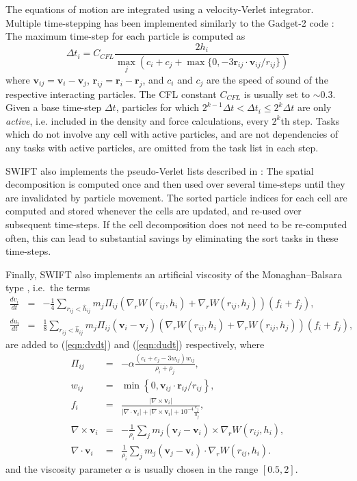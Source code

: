 \documentclass[final]{siamltex}
\newcommand{\eqn}[1]
    {(\ref{eqn:#1})}
\begin{document}
The equations of motion are integrated using a velocity-Verlet
integrator.
Multiple time-stepping has been implemented similarly to
the Gadget-2 code \cite{ref:Springel2005}: The maximum time-step
for each particle is computed as
%
\begin{equation}
    \Delta t_i = C_{CFL}\frac{2 h_i}{ \max_j\left( c_i + c_j + \max\{0,-3 \mathbf r_{ij} \cdot \mathbf v_{ij} / r_{ij} \} \right) }
    \label{eqn:dt}
\end{equation}
%
where $\mathbf v_{ij} = \mathbf v_i - \mathbf v_j$,
$\mathbf r_{ij} = \mathbf r_i - \mathbf r_j$, and $c_i$ and $c_j$
are the speed of sound of the respective interacting particles.
The CFL constant $C_{CFL}$ is usually set to $\sim 0.3$.
Given a base time-step $\Delta t$, particles for which
$2^{k-1}\Delta t < \Delta t_i \leq 2^k\Delta t$ are only {\em active},
i.e. included in the density and force calculations, every $2^k$th step.
Tasks which do not involve any cell with active particles, and
are not dependencies of any tasks with active particles, are
omitted from the task list in each step.

SWIFT also implements the pseudo-Verlet lists described in
\cite{ref:Gonnet2013}: The spatial decomposition is computed once
and then used over several time-steps until they are invalidated
by particle movement.
The sorted particle indices for each cell are computed and stored
whenever the cells are updated, and re-used over subsequent time-steps.
If the cell decomposition does not need to be re-computed often,
this can lead to substantial savings by eliminating the sort tasks
in these time-steps.

Finally, SWIFT also implements an artificial viscosity of the
Monaghan--Balsara type \cite{ref:Monaghan1983,ref:Balsara1995},
i.e.~the terms
%
\begin{eqnarray*}
    \frac{dv_i}{dt} & = & -\frac{1}{4}\sum_{r_{ij} < \hat{h}_{ij}} m_j \Pi_{ij} \left({\nabla_r}W({r}_{ij},
    h_i)+{\nabla_r}W({r}_{ij}, h_j)\right) (f_i+f_j),\\
    \frac{du_i}{dt} & = & \frac{1}{8} \sum_{r_{ij} < \hat{h}_{ij}} m_j \Pi_{ij}(\mathbf{v}_i - \mathbf{v}_j)
    \left({\nabla_r}W({r}_{ij},
    h_i)+{\nabla_r}W({r}_{ij}, h_j)\right) (f_i+f_j),
\end{eqnarray*}
%
are added to \eqn{dvdt} and \eqn{dudt} respectively, where
%
\begin{eqnarray*}
    \Pi_{ij} &=& -\alpha \frac{\left(c_i + c_j - 3w_{ij}\right)w_{ij}}{\rho_i + \rho_j}, \\
    w_{ij} &=& \min\left\{0, \mathbf{v}_{ij}\cdot\mathbf{r}_{ij} / r_{ij}\right\}, \\
    f_i &=& \frac{|\nabla \times \mathbf{v}_i|}{|\nabla \cdot \mathbf{v}_i| + |\nabla \times \mathbf{v}_i| +
    10^{-4}\frac{c_j}{h_j}}, \\
    \nabla \times \mathbf{v}_i &=& -\frac{1}{\rho_i}\sum_j m_j (\mathbf{v}_j - \mathbf{v}_i)\times
    {\nabla_r}W({r}_{ij}, h_i), \\
    \nabla \cdot \mathbf{v}_i &=& \frac{1}{\rho_i}\sum_j m_j (\mathbf{v}_j - \mathbf{v}_i)\cdot {\nabla_r}W({r}_{ij},
    h_i).
\end{eqnarray*}
%
and the viscosity parameter $\alpha$ is usually chosen in the
range $[0.5,2]$.
\end{document}
